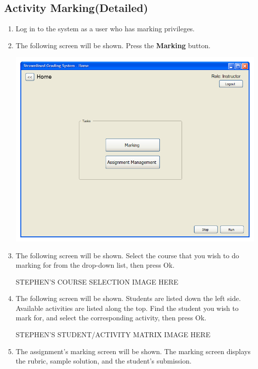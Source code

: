 \documentclass{article}
\begin{document}
\subsection{Activity Marking(Detailed)}
\begin{enumerate}
  \item Log in to the system as a user who has marking privileges.
  \item The following screen will be shown.  Press the \textbf{Marking} button.
  \begin{center} 
   \includegraphics[scale=0.6]{../images/UIMockups/PNG_Renders/LandingPage}
  \end{center}
  \item The following screen will be shown.  Select the course that you wish to do marking for from the drop-down list, then press Ok.
    \begin{center} 
   STEPHEN'S COURSE SELECTION IMAGE HERE
    \end{center}
  \item The following screen will be shown.  Students are listed down the left side.  Available activities are listed along the top.  Find the student you wish to mark for, and select the corresponding activity, then press Ok.
  \begin{center} 
   STEPHEN'S STUDENT/ACTIVITY MATRIX IMAGE HERE
    \end{center}
  \item The assignment's marking screen will be shown.  The marking screen displays the rubric, sample solution, and the student's submission. 
  \begin{center} 

\end{center}
\end{enumerate}
\end{document}
